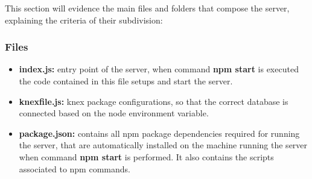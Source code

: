 This section will evidence the main files and folders that compose the server, explaining the criteria of their subdivision:

\subsubsection{Files}
\begin{itemize}
	\item \textbf{index.js:} entry point of the server, when command \textbf{npm start} is executed the code contained in this file setups and start the server.
	\item \textbf{knexfile.js:} knex package configurations, so that the correct database is connected based on the node environment variable.
	\item \textbf{package.json:} contains all npm package dependencies required for running the server, that are automatically installed on the machine running the server when command \textbf{npm start} is performed. It also contains the scripts associated to npm commands.
\end{itemize}

